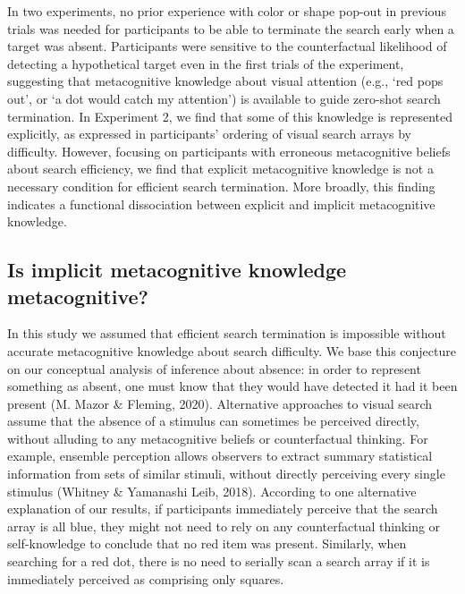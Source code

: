 \documentclass[12pt,twoside]{reedthesis}
\begin{document}
In two experiments, no prior experience with color or shape pop-out in previous trials was needed for participants to be able to terminate the search early when a target was absent. Participants were sensitive to the counterfactual likelihood of detecting a hypothetical target even in the first trials of the experiment, suggesting that metacognitive knowledge about visual attention (e.g., `red pops out', or `a dot would catch my attention') is available to guide zero-shot search termination. In Experiment 2, we find that some of this knowledge is represented explicitly, as expressed in participants' ordering of visual search arrays by difficulty. However, focusing on participants with erroneous metacognitive beliefs about search efficiency, we find that explicit metacognitive knowledge is not a necessary condition for efficient search termination. More broadly, this finding indicates a functional dissociation between explicit and implicit metacognitive knowledge.

\hypertarget{is-implicit-metacognitive-knowledge-metacognitive}{%
\subsection{Is implicit metacognitive knowledge metacognitive?}\label{is-implicit-metacognitive-knowledge-metacognitive}}

In this study we assumed that efficient search termination is impossible without accurate metacognitive knowledge about search difficulty. We base this conjecture on our conceptual analysis of inference about absence: in order to represent something as absent, one must know that they would have detected it had it been present (M. Mazor \& Fleming, 2020). Alternative approaches to visual search assume that the absence of a stimulus can sometimes be perceived directly, without alluding to any metacognitive beliefs or counterfactual thinking. For example, ensemble perception allows observers to extract summary statistical information from sets of similar stimuli, without directly perceiving every single stimulus (Whitney \& Yamanashi Leib, 2018). According to one alternative explanation of our results, if participants immediately perceive that the search array is all blue, they might not need to rely on any counterfactual thinking or self-knowledge to conclude that no red item was present. Similarly, when searching for a red dot, there is no need to serially scan a search array if it is immediately perceived as comprising only squares.
\end{document}
